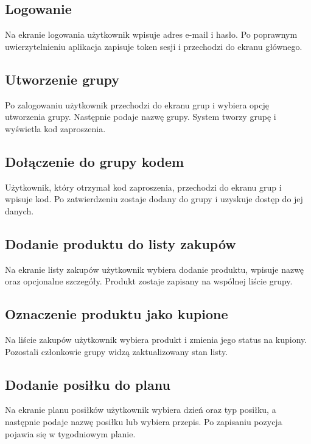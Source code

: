 \documentclass[12pt,a4paper]{article}
\begin{document}
\subsection{Logowanie}

Na ekranie logowania użytkownik wpisuje adres e-mail i hasło. Po poprawnym uwierzytelnieniu aplikacja zapisuje token sesji i przechodzi do ekranu głównego.

\subsection{Utworzenie grupy}

Po zalogowaniu użytkownik przechodzi do ekranu grup i wybiera opcję utworzenia grupy. Następnie podaje nazwę grupy. System tworzy grupę i wyświetla kod zaproszenia.

\subsection{Dołączenie do grupy kodem}

Użytkownik, który otrzymał kod zaproszenia, przechodzi do ekranu grup i wpisuje kod. Po zatwierdzeniu zostaje dodany do grupy i uzyskuje dostęp do jej danych.

\subsection{Dodanie produktu do listy zakupów}

Na ekranie listy zakupów użytkownik wybiera dodanie produktu, wpisuje nazwę oraz opcjonalne szczegóły. Produkt zostaje zapisany na wspólnej liście grupy.

\subsection{Oznaczenie produktu jako kupione}

Na liście zakupów użytkownik wybiera produkt i zmienia jego status na kupiony. Pozostali członkowie grupy widzą zaktualizowany stan listy.

\subsection{Dodanie posiłku do planu}

Na ekranie planu posiłków użytkownik wybiera dzień oraz typ posiłku, a następnie podaje nazwę posiłku lub wybiera przepis. Po zapisaniu pozycja pojawia się w tygodniowym planie.
\end{document}

